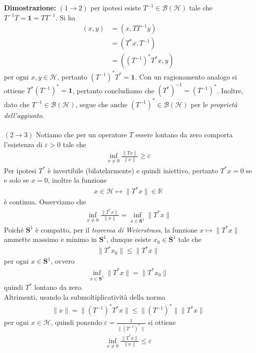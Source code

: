 \documentclass{article}
\numberwithin{equation}{subsection}
\begin{document}
\textbf{Dimostrazione:} $(1 \rightarrow 2)$ per ipotesi esiste $T^{-1} \in \mathcal{B}(\mathcal{H})$ tale che $T^{-1}T = \mathbf{1} = TT^{-1}$. Si ha 
\begin{align*}
    (x, y) &= (x, TT^{-1}y)  \\
    &= (T^*x, T^{-1})  \\
    &= ((T^{-1})^*T^*x, y) 
\end{align*}
per ogni $x, y \in \mathcal{H}$, pertanto $(T^{-1})^*T^* = \mathbf{1}$. Con un ragionamento analogo si ottiene $T^*(T^{-1})^* = \mathbf{1}$, pertanto concludiamo che $(T^*)^{-1} = (T^{-1})^*$. Inoltre, dato che $T^{-1} \in \mathcal{B}(\mathcal{H})$, segue che anche $(T^{-1})^* \in \mathcal{B}(\mathcal{H})$ per le \textit{proprietà dell'aggiunto}. \\ \\
$(2 \rightarrow 3)$ Notiamo che per un operatore $T$ essere lontano da zero comporta l'esistenza di $\varepsilon > 0$ tale che 
\begin{align*}
    \inf_{x \neq 0}\frac{\|Tx\|}{\|x\|} \geq \varepsilon 
\end{align*}
Per ipotesi $T^*$ è invertibile (bilatelarmente) e quindi iniettivo, pertanto $T^*x = 0$ se e solo se $x = 0$, inoltre la funzione 
\begin{align*}
    x \in \mathcal{H} \mapsto \|T^*x\| \in \mathbb{R} 
\end{align*}
è continua. Osserviamo che 
\begin{align*}
    \inf_{x \neq 0}\frac{\|T^*x\|}{\|x\|} = \inf_{x \in \mathbf{S}^1}\|T^*x\| 
\end{align*}
Poiché $\mathbf{S}^1$ è compatto, per il \textit{teorema di Weierstrass}, la funzione $x \mapsto \|T^*x\|$ ammette massimo e minimo in $\mathbf{S}^1$, dunque esiste $x_0 \in \mathbf{S}^1$ tale che 
\begin{align*}
    \|T^*x_0\| \leq \|T^*x\| 
\end{align*}
per ogni $x \in \mathbf{S}^1$, ovvero 
\begin{align*}
    \inf_{x \in \mathbf{S}^1}\|T^*x\| = \|T^*x_0\| 
\end{align*}
quindi $T^*$ lontano da zero. \\
Altrimenti, usando la submoltiplicatività della norma 
\begin{align*}
    \|x\| = \|(T^{-1})^*T^*x\| \leq \|(T^{-1})^*\|\|T^*x\| 
\end{align*}
per ogni $x \in \mathcal{H}$, quindi ponendo $\varepsilon = \frac{1}{\|(T^{-1})^*\|}$ si ottiene 
\begin{align*}
    \inf_{x \neq 0}\frac{\|T^*x\|}{\|x\|} \leq \varepsilon 
\end{align*}
\end{document}
